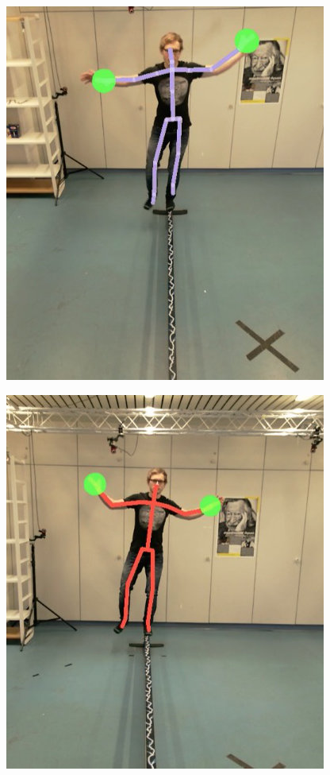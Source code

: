 \begin{figure}[htb]
	\centering
	\begin{minipage}[t]{0.32\linewidth}
		\centering
		\includegraphics[width=1\linewidth]{Pictures/5_3_kinectHeightHigh}
		\label{fig:5_3_kinectHeightHigh}
	\end{minipage}
	\hfill
	\begin{minipage}[t]{0.32\linewidth}
		\centering
		\includegraphics[width=1\linewidth]{Pictures/5_3_kinectHeightMiddle}

\end{minipage}
\end{figure}
